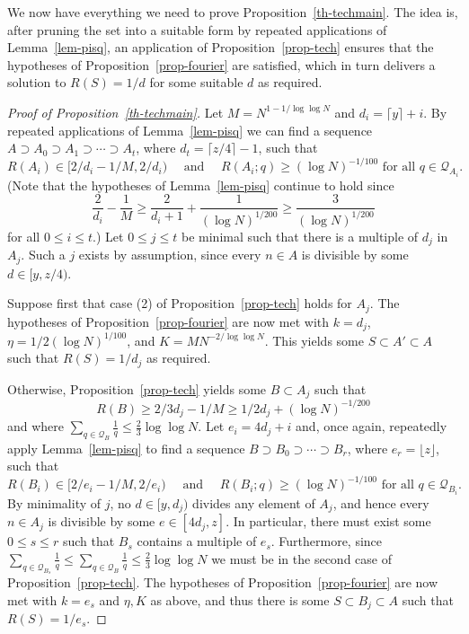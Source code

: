 \documentclass{amsart}
\begin{document}
We now have everything we need to prove Proposition~\ref{th-techmain}. The idea is, after pruning the set into a suitable form by repeated applications of Lemma~\ref{lem-pisq}, an application of Proposition~\ref{prop-tech} ensures that the hypotheses of Proposition~\ref{prop-fourier} are satisfied, which in turn delivers a solution to $R(S)=1/d$ for some suitable $d$ as required.

\begin{proof}[Proof of Proposition~\ref{th-techmain}]
Let $M=N^{1-1/\log\log N}$ and $d_i = \lceil y \rceil +i$. By repeated applications of Lemma~\ref{lem-pisq} we can find a sequence $A\supset A_0\supset A_1\supset\cdots \supset A_{t}$, where $d_t=\lceil z/4\rceil-1$, such that
\[R(A_i)\in [2/d_i-1/M,2/d_i)\quad\textrm{ and }\quad R(A_i;q)\geq (\log N)^{-1/100}\textrm{ for all }q\in \mathcal{Q}_{A_i}.\]
(Note that the hypotheses of Lemma~\ref{lem-pisq} continue to hold since 
\[\frac{2}{d_i}-\frac{1}{M}\geq \frac{2}{d_{i}+1}+\frac{1}{(\log N)^{1/200}}\geq \frac{3}{(\log N)^{1/200}}\]
for all $0\leq i\leq t$.) Let $0\leq j\leq t$ be minimal such that there is a multiple of $d_j$ in $A_j$. Such a $j$ exists by assumption, since every $n\in A$ is divisible by some $d\in[y,z/4)$. 

Suppose first that case (2) of Proposition~\ref{prop-tech} holds for $A_j$. The hypotheses of Proposition~\ref{prop-fourier} are now met with $k=d_j$, $\eta=1/2(\log N)^{1/100}$, and $K=MN^{-2/\log \log N}$. This yields some $S\subset A'\subset A$ such that $R(S)=1/d_j$ as required.

Otherwise, Proposition~\ref{prop-tech} yields some $B\subset A_j$ such that 
\[R(B)\geq 2/3d_j-1/M\geq 1/2d_j+(\log N)^{-1/200}\]
and where $\sum_{q\in\mathcal{Q}_B}\frac{1}{q}\leq \frac{2}{3}\log\log N$. Let $e_i = 4d_j+i$ and, once again, repeatedly apply Lemma~\ref{lem-pisq} to find a sequence $B\supset B_0\supset \cdots\supset B_r$, where $e_r=\lfloor z\rfloor$, such that
\[R(B_i)\in [2/e_i-1/M,2/e_i)\quad\textrm{ and }\quad R(B_i;q)\geq (\log N)^{-1/100}\textrm{ for all }q\in \mathcal{Q}_{B_i}.\]
By minimality of $j$, no $d\in [y,d_j)$ divides any element of $A_j$, and hence every $n\in A_j$ is divisible by some $e\in [4d_j,z]$. In particular, there must exist some $0\leq s\leq r$ such that $B_s$ contains a multiple of $e_s$. Furthermore, since $\sum_{q\in \mathcal{Q}_{B_s}}\frac{1}{q}\leq \sum_{q\in\mathcal{Q}_B}\frac{1}{q}\leq \frac{2}{3}\log\log N$ we must be in the second case of Proposition~\ref{prop-tech}. The hypotheses of Proposition~\ref{prop-fourier} are now met with $k=e_s$ and $\eta,K$ as above, and thus there is some $S\subset B_j\subset A$ such that $R(S)=1/e_s$. 
\end{proof}
\end{document}
